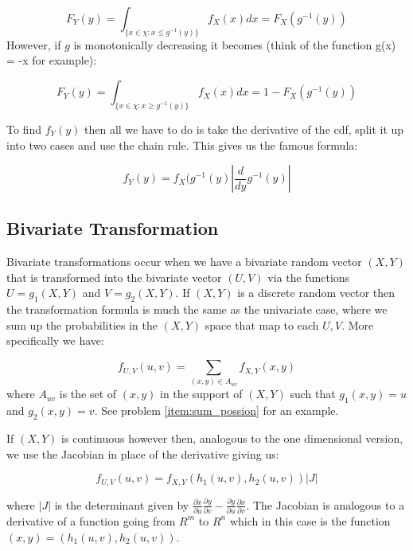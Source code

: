 \begin{equation}
F_Y(y) = \int_{\{x \in \chi: x \leq g^{-1}(y) \}} f_X(x) dx = F_X(g^{-1}(y))
\end{equation}
\noindent However, if $g$ is monotonically decreasing it becomes (think of the function g(x) = -x for example):

\begin{equation}
F_Y(y) =  \int_{\{x \in \chi: x \geq g^{-1}(y) \}} f_X(x) dx = 1 - F_X(g^{-1}(y))
\end{equation}

To find $f_Y(y)$ then all we have to do is take the derivative of the cdf, split it up into two cases and use the chain rule. This gives us the famous formula:

\begin{equation}
f_Y(y) = f_X(g^{-1}(y) |\frac{d}{dy} g^{-1}(y)| 
\end{equation}

\subsection{Bivariate Transformation}

Bivariate transformations occur when we have a bivariate random vector $(X,Y)$ that is transformed into the bivariate vector $(U,V)$ via the functions $U=g_1(X,Y)$ and $V=g_2(X,Y)$. If $(X,Y)$ is a discrete random vector then the transformation formula is much the same as the univariate case, where we sum up the probabilities in the $(X,Y)$ space that map to each $U,V$. More specifically we have:

\begin{equation}
f_{U,V}(u,v) = \sum_{(x,y) \in A_{uv}} f_{X,Y}(x,y)
\end{equation}
\noindent where $A_{uv}$ is the set of $(x,y)$ in the support of $(X,Y)$ such that $g_1(x,y) = u$ and $g_2(x,y)=v$. See problem \ref{item:sum_possion} for an example.

If $(X,Y)$ is continuous however then, analogous to the one dimensional version, we use the Jacobian in place of the derivative giving us:

\begin{equation}
f_{U,V}(u,v) = f_{X,Y}(h_1(u,v), h_2(u,v))|J|
\end{equation}

\noindent where $|J|$ is the determinant given by $\frac{\partial x}{\partial u} \frac{\partial y}{\partial v} - \frac{\partial y}{\partial u} \frac{\partial x}{\partial v}$. The Jacobian is analogous to a derivative of a function going from $R^{m}$ to $R^{n}$ which in this case is the function $(x,y) = (h_1(u,v), h_2(u,v))$. 

